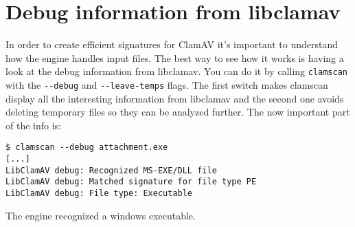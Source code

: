 \documentclass[a4paper,titlepage,12pt]{article}
\begin{document}
    \section{Debug information from libclamav}
    In order to create efficient signatures for ClamAV it's important
    to understand how the engine handles input files. The best way
    to see how it works is having a look at the debug information from
    libclamav. You can do it by calling \verb+clamscan+ with the
    \verb+--debug+ and \verb+--leave-temps+ flags. The first switch
    makes clamscan display all the interesting information from
    libclamav and the second one avoids deleting temporary files so
    they can be analyzed further. The now important part of the info
    is:
    \begin{verbatim}
$ clamscan --debug attachment.exe
[...]
LibClamAV debug: Recognized MS-EXE/DLL file
LibClamAV debug: Matched signature for file type PE
LibClamAV debug: File type: Executable
    \end{verbatim}
    The engine recognized a windows executable.
\end{document}
